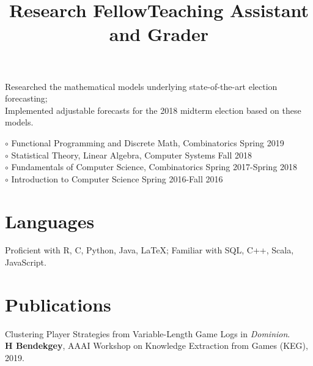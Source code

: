 \documentclass[margin]{res}
\begin{document}
\begin{resume}
\title{\textbf{Research Fellow}}
\begin{position}
Researched the mathematical models underlying state-of-the-art election forecasting;\\
Implemented adjustable forecasts for the 2018 midterm election based on these models.
\end{position}

\dates{}
\title{\textbf{Teaching Assistant and Grader}}
\begin{position}
$\circ$  Functional Programming and Discrete Math, Combinatorics \hfill Spring 2019\\
$\circ$ Statistical Theory, Linear Algebra, Computer Systems \hfill Fall 2018\\
$\circ$  Fundamentals of Computer Science, Combinatorics \hfill Spring 2017-Spring 2018\\
$\circ$ Introduction to Computer Science \hfill Spring 2016-Fall 2016
\end{position}



\section{Languages}

Proficient with R, C, Python, Java, \LaTeX; Familiar with SQL, C++, Scala, JavaScript.


\section{Publications}
\par
Clustering Player Strategies from Variable-Length Game Logs in \emph{Dominion}.\\ \textbf{H Bendekgey}, AAAI Workshop on Knowledge Extraction from Games (KEG), 2019.


\end{resume}
\end{document}
